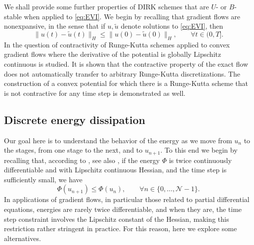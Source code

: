 \documentclass{amsart}
\newcommand{\mclN}{\mathcal{N}}
\newcommand{\aer}[1]{{\color{red}{{#1}}}}
\theoremstyle{definition}
\begin{document}
We shall provide some further properties of DIRK schemes that are $U$- or $B$-stable when applied to \eqref{eq:EVI}.
We begin by recalling that gradient flows are nonexpansive, in the sense that if $u, \tilde{u}$ denote solutions to \eqref{eq:EVI}, then
\[
  \| u(t) - \tilde{u}(t) \|_H \leq \| u(0) - \tilde{u}(0) \|_H, \qquad \forall t \in (0,T].
\]
In \cite{MR4121887} the question of contractivity of Runge-Kutta schemes applied to convex gradient flows where the derivative of the potential is globally Lipschitz continuous is studied. It is shown that the contractive property of the exact flow does not automatically transfer to arbitrary Runge-Kutta discretizations. The construction of a convex potential for which there is a Runge-Kutta scheme that is not contractive for any time step is demonstrated as well.

\subsection{Discrete energy dissipation}

Our goal here is to understand the behavior of the energy as we move from $u_n$ to the stages, from one stage to the next, and to $u_{n+1}$. To this end we begin by recalling that, according to \cite[Theorem 2.1]{MR3194795}, see also \cite{MR1293524}, if the energy $\Phi$ is twice continuously differentiable and with Lipschitz continuous Hessian, and the time step is sufficiently small, we have
\begin{equation}
\label{eq:Phiunp1leqPhiun}
  \Phi(u_{n+1}) \leq \Phi(u_n), \qquad \forall n \in \{0, \ldots, \mclN-1\}.
\end{equation}
In applications of gradient flows, in particular those related to partial differential equations, energies are rarely twice differentiable, and when they are, the time step constraint involves the Lipschitz constant of the Hessian, making this restriction rather stringent in practice. For this reason, here we explore some alternatives.

% 
\end{document}
